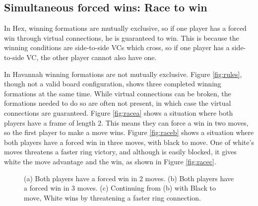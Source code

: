 \subsection{Simultaneous forced wins: Race to win}

In Hex, winning formations are mutually exclusive, so if one player has a forced win through virtual connections, he is guaranteed to win. This is because the winning conditions are side-to-side VCs which cross, so if one player has a side-to-side VC, the other player cannot also have one.

In Havannah winning formations are not mutually exclusive. Figure \ref{fig:rules}, though not a valid board configuration, shows three completed winning formations at the same time. While virtual connections can be broken, the formations needed to do so are often not present, in which case the virtual connections are guaranteed. Figure \ref{fig:racea} shows a situation where both players have a frame of length 2. This means they can force a win in two moves, so the first player to make a move wins. Figure \ref{fig:raceb} shows a situation where both players have a forced win in three moves, with black to move. One of white's moves threatens a faster ring victory, and although is easily blocked, it gives white the move advantage and the win, as shown in Figure \ref{fig:racec}.


\begin{figure}
	\centering
	\caption{(a) Both players have a forced win in 2 moves. (b) Both players have a forced win in 3 moves. (c) Continuing from (b) with Black to move, White wins
by threatening a faster ring connection.}
	\label{fig:race}
\end{figure}


